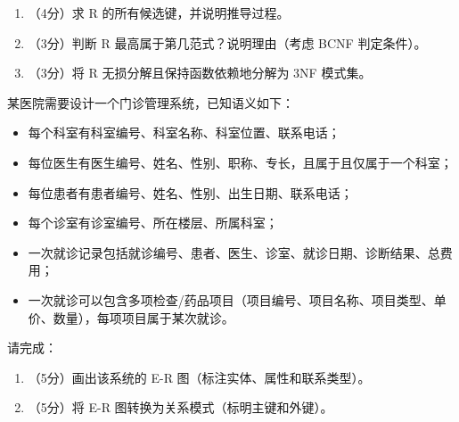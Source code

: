 \documentclass[a4paper,11pt]{article}
\begin{document}
\begin{enumerate}[leftmargin=2em, itemsep=3pt]
  \item[（1）] （4分）求 R 的所有候选键，并说明推导过程。
  \item[（2）] （3分）判断 R 最高属于第几范式？说明理由（考虑 BCNF 判定条件）。
  \item[（3）] （3分）将 R 无损分解且保持函数依赖地分解为 3NF 模式集。
\end{enumerate}

\anslines{3.5cm}


\q 某医院需要设计一个门诊管理系统，已知语义如下：
\begin{itemize}
  \item 每个科室有科室编号、科室名称、科室位置、联系电话；
  \item 每位医生有医生编号、姓名、性别、职称、专长，且属于且仅属于一个科室；
  \item 每位患者有患者编号、姓名、性别、出生日期、联系电话；
  \item 每个诊室有诊室编号、所在楼层、所属科室；
  \item 一次就诊记录包括就诊编号、患者、医生、诊室、就诊日期、诊断结果、总费用；
  \item 一次就诊可以包含多项检查/药品项目（项目编号、项目名称、项目类型、单价、数量），每项项目属于某次就诊。
\end{itemize}
请完成：
\begin{enumerate}[leftmargin=2em, itemsep=3pt]
  \item[（1）] （5分）画出该系统的 E-R 图（标注实体、属性和联系类型）。
  \item[（2）] （5分）将 E-R 图转换为关系模式（标明主键和外键）。
\end{enumerate}

\anslines{4cm}

\end{document}
